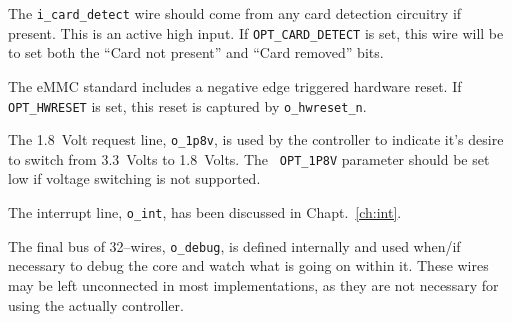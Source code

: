 \documentclass{gqtekspec}
\begin{document}
The {\tt i\_card\_detect} wire should come from any card detection circuitry
if present.  This is an active high input.  If {\tt OPT\_CARD\_DETECT} is
set, this wire will be to set both the ``Card not present'' and ``Card
removed'' bits.

The eMMC standard includes a negative edge triggered hardware reset.  If
{\tt OPT\_HWRESET} is set, this reset is captured by {\tt o\_hwreset\_n}.

The 1.8~Volt request line, {\tt o\_1p8v}, is used by the controller to
indicate it's desire to switch from 3.3~Volts to 1.8~Volts.  The {\tt
OPT\_1P8V} parameter should be set low if voltage switching is not supported.

The interrupt line, {\tt o\_int}, has been discussed in Chapt.~\ref{ch:int}.

The final bus of 32--wires, {\tt o\_debug}, is defined internally and used
when/if necessary to debug the core and watch what is going on within it.
These wires may be left unconnected in most implementations, as they are not
necessary for using the actually controller.

\end{document}
